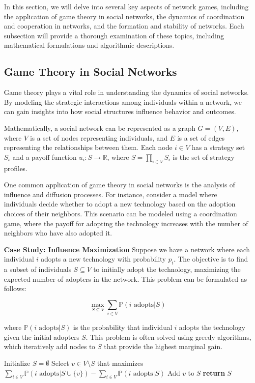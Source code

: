 \documentclass[12pt]{book} %
\begin{document}
In this section, we will delve into several key aspects of network games, including the application of game theory in social networks, the dynamics of coordination and cooperation in networks, and the formation and stability of networks. Each subsection will provide a thorough examination of these topics, including mathematical formulations and algorithmic descriptions.

\subsection{Game Theory in Social Networks}
Game theory plays a vital role in understanding the dynamics of social networks. By modeling the strategic interactions among individuals within a network, we can gain insights into how social structures influence behavior and outcomes.

Mathematically, a social network can be represented as a graph $G = (V, E)$, where $V$ is a set of nodes representing individuals, and $E$ is a set of edges representing the relationships between them. Each node $i \in V$ has a strategy set $S_i$ and a payoff function $u_i: S \to \mathbb{R}$, where $S = \prod_{i \in V} S_i$ is the set of strategy profiles.

One common application of game theory in social networks is the analysis of influence and diffusion processes. For instance, consider a model where individuals decide whether to adopt a new technology based on the adoption choices of their neighbors. This scenario can be modeled using a coordination game, where the payoff for adopting the technology increases with the number of neighbors who have also adopted it.

\textbf{Case Study: Influence Maximization}
Suppose we have a network where each individual $i$ adopts a new technology with probability $p_i$. The objective is to find a subset of individuals $S \subseteq V$ to initially adopt the technology, maximizing the expected number of adopters in the network. This problem can be formulated as follows:

\[
\max_{S \subseteq V} \sum_{i \in V} \mathbb{P}(i \text{ adopts} | S)
\]

where $\mathbb{P}(i \text{ adopts} | S)$ is the probability that individual $i$ adopts the technology given the initial adopters $S$. This problem is often solved using greedy algorithms, which iteratively add nodes to $S$ that provide the highest marginal gain.
\FloatBarrier
\begin{algorithm}
\caption{Greedy Algorithm for Influence Maximization}
\begin{algorithmic}[1]
\State Initialize $S = \emptyset$
    \State Select $v \in V \setminus S$ that maximizes $\sum_{i \in V} \mathbb{P}(i \text{ adopts} | S \cup \{v\}) - \sum_{i \in V} \mathbb{P}(i \text{ adopts} | S)$
    \State Add $v$ to $S$
\EndFor
\State \textbf{return} $S$
\end{algorithmic}
\end{algorithm}
\FloatBarrier
\end{document}
